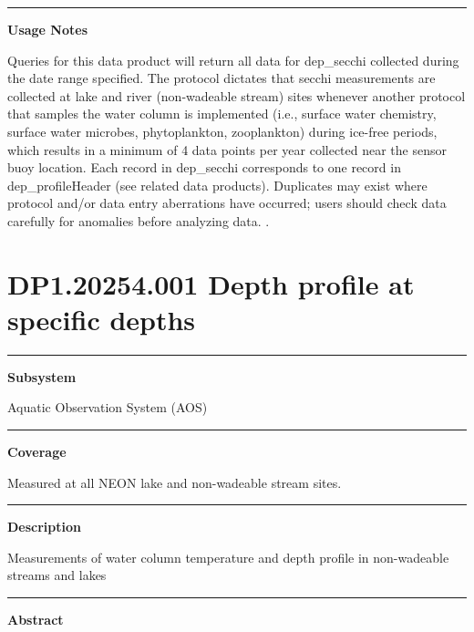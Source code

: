 \documentclass[]{article}
\begin{document}
\begin{center}\rule{0.5\linewidth}{\linethickness}\end{center}

\textbf{Usage Notes}

Queries for this data product will return all data for dep\_secchi
collected during the date range specified. The protocol dictates that
secchi measurements are collected at lake and river (non-wadeable
stream) sites whenever another protocol that samples the water column is
implemented (i.e., surface water chemistry, surface water microbes,
phytoplankton, zooplankton) during ice-free periods, which results in a
minimum of 4 data points per year collected near the sensor buoy
location. Each record in dep\_secchi corresponds to one record in
dep\_profileHeader (see related data products). Duplicates may exist
where protocol and/or data entry aberrations have occurred; users should
check data carefully for anomalies before analyzing data. \newpage
.

\section{DP1.20254.001 Depth profile at specific
depths}\label{dp1.20254.001-depth-profile-at-specific-depths}

\begin{center}\rule{0.5\linewidth}{\linethickness}\end{center}

\textbf{Subsystem}

Aquatic Observation System (AOS)

\begin{center}\rule{0.5\linewidth}{\linethickness}\end{center}

\textbf{Coverage}

Measured at all NEON lake and non-wadeable stream sites.

\begin{center}\rule{0.5\linewidth}{\linethickness}\end{center}

\textbf{Description}

Measurements of water column temperature and depth profile in
non-wadeable streams and lakes

\begin{center}\rule{0.5\linewidth}{\linethickness}\end{center}

\textbf{Abstract}
\end{document}
